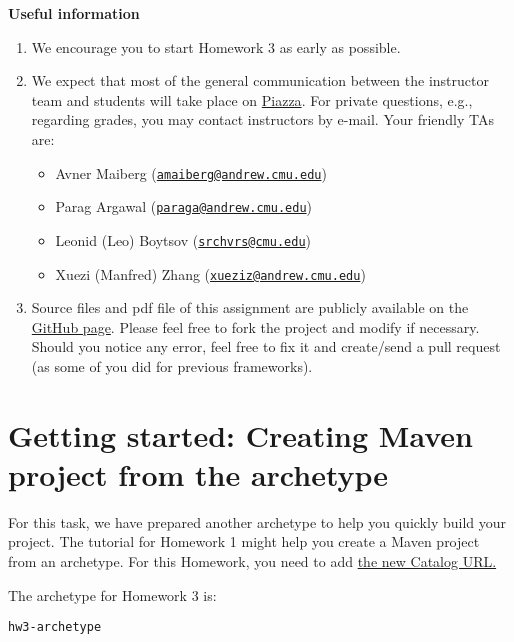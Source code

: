 \documentclass[oneside,11pt]{memoir}
\begin{document}
\textbf{Useful information}
\begin{enumerate}
\item We encourage you to start Homework 3 as early as possible.

\item 
We expect that most of the general communication between the instructor team and students will take place on 
\href{https://piazza.com/class/hyvsubeilei6dd}{Piazza}.
For private questions, e.g., regarding grades, you may contact instructors by e-mail.
Your friendly TAs are:
\begin{itemize}
\item Avner Maiberg (\href{mailto:amaiberg@andrew.cmu.edu}{\nolinkurl{amaiberg@andrew.cmu.edu}}) 
\item Parag Argawal (\href{mailto:paraga@andrew.cmu.edu}{\nolinkurl{paraga@andrew.cmu.edu}}) 
\item Leonid (Leo) Boytsov (\href{mailto:srchvrs@cmu.edu}{\nolinkurl{srchvrs@cmu.edu}})
\item Xuezi (Manfred) Zhang (\href{mailto:xueziz@andrew.cmu.edu}{\nolinkurl{xueziz@andrew.cmu.edu}}) 
\end{itemize}

\item Source files and pdf file of this assignment are publicly available on 
the  \href{http://github.com/amaiberg/software-engineering-preliminary}{GitHub page}.
Please feel free to fork the project and modify if necessary.
Should you notice any error, feel free to fix it and create/send a pull request (as some
of you did for previous frameworks).  

\end{enumerate}
\hspace{-0.1\textwidth}

\chapter*{Getting started: Creating Maven project from the archetype}
For this task, we have prepared another archetype to help you quickly build your project. 
The tutorial for Homework 1 might help you create a Maven project from an archetype.
For this Homework, you need to add 
\href{https://raw.githubusercontent.com/oaqa/DEIIS-hw3-archetype/master/archetype-catalog.xml}{the new Catalog URL.}


The archetype for Homework 3 is:

\begin{center}\texttt{hw3-archetype}\end{center}
\end{document}
